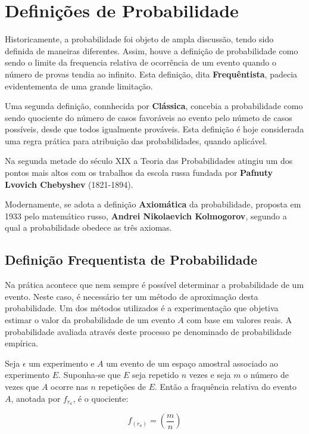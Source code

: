 \newpage 
\section{Definições de Probabilidade}

Historicamente, a probabilidade foi objeto de ampla discussão, tendo sido definida de maneiras diferentes. Assim, houve a definição de probabilidade como sendo o limite da frequencia relativa de ocorrência de um evento quando o número de provas tendia ao infinito. Esta definição, dita \textbf{Frequêntista}, padecia evidentementa de uma grande limitação.\vskip0.3cm
 
Uma segunda definição, connhecida por \textbf{Clássica}, concebia a probabilidade como sendo quociente do número de casos favoráveis ao evento pelo númeto de casos possíveis, desde que todos igualmente prováveis. Esta definição é hoje considerada uma regra prática para atribuição das probabilidades, quando aplicável.\vskip0.3cm

Na segunda metade do século XIX a Teoria das Probabilidades atingiu um dos pontos mais altos com os trabalhos da escola russa fundada por \textbf{Pafnuty Lvovich Chebyshev} (1821-1894).\vskip0.3cm
 
Modernamente, se adota a definição \textbf{Axiomática} da probabilidade, proposta em 1933 pelo matemático russo, \textbf{Andrei Nikolaevich Kolmogorov}, segundo a qual a probabilidade obedece as três axiomas.
 

\subsection{Definição Frequentista de Probabilidade}

Na prática acontece que nem sempre é possível determinar a probabilidade de um evento. Neste caso, é necessário ter um método de aproximação desta probabilidade. Um dos métodos utilizados é a experimentação que objetiva estimar o valor da probabilidade de um evento $A$ com base em valores reais. A probabilidade avaliada através deste processo pe denominado de probabilidade empírica.\vskip0.3cm

Seja $\epsilon$ um experimento e $A$ um evento de um espaço amostral associado ao experimento $E$. Suponha-se que $E$ seja repetido $n$ vezes e seja $m$ o número de vezes que $A$ ocorre nas $n$ repetições de $E$. Então a fraquência relativa do evento $A$, anotada por $f_{r_{a}}$, é o quociente:
 
\begin{equation}
     f_{(r_{a})}= \left( \frac{m}{n} \right)
\end{equation}
 
